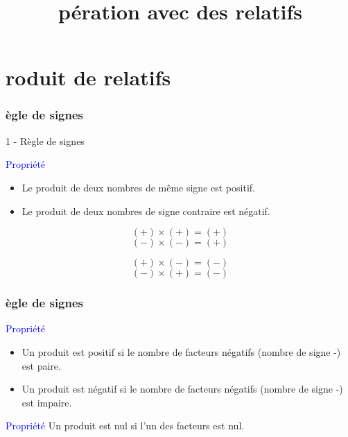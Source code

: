 \documentclass{beamer}
\title{\rmfamily{\textsc{O}}pération avec des relatifs}
\begin{document}
\frame{\titlepage}

\section{roduit de relatifs}

\begin{frame}
  \frametitle{ègle de signes}

  \alert{1 - Règle de signes}

  \begin{block}{\textcolor{blue}{Propriété}}
    \begin{itemize}
    \item Le produit de deux nombres de même signe est positif.
    \item Le produit de deux nombres de signe contraire est négatif.
    \end{itemize}

    \begin{multicols}{2}
      $$(+) \times (+) = (+)$$
      $$(-) \times (-) = (+)$$

      $$(+) \times (-) = (-)$$
      $$(-) \times (+) = (-)$$
    \end{multicols}
  \end{block}
\end{frame}

\begin{frame}
  \frametitle{ègle de signes}

  \begin{block}{\textcolor{blue}{Propriété}}
    \begin{itemize}
    \item Un produit est positif si le nombre de facteurs négatifs (nombre de signe -) est paire. 
    \item Un produit est négatif si le nombre de facteurs négatifs (nombre de signe -) est impaire. 
    \end{itemize}
  \end{block}

  \begin{block}{\textcolor{blue}{Propriété}}
    Un produit est nul si l'un des facteurs est nul.
  \end{block}



\end{frame}
\end{document}
